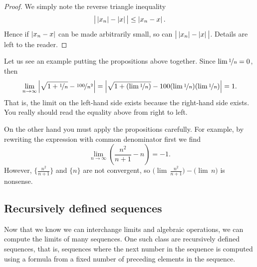 \begin{proof}
We simply note the reverse triangle inequality
\begin{equation*}
\big\lvert \left\lvert {x_n} \right\rvert - \left\lvert {x} \right\rvert \big\rvert \leq \left\lvert {x_n-x} \right\rvert .
\end{equation*}
Hence if $\left\lvert {x_n -x} \right\rvert$ can be made arbitrarily small, so can
$\big\lvert \left\lvert {x_n} \right\rvert - \left\lvert {x} \right\rvert \big\rvert$.
Details are left to the reader.
\end{proof}

Let us see an example putting the propositions above together.  Since
$\lim \nicefrac{1}{n} = 0$, then
\begin{equation*}
\lim_{n\to \infty}
\left\lvert {\sqrt{1 + \nicefrac{1}{n}} - \nicefrac{100}{n^2}} \right\rvert =  
\left\lvert {\sqrt{1 + (\lim \nicefrac{1}{n})} - 100 (\lim \nicefrac{1}{n})(\lim
\nicefrac{1}{n})} \right\rvert = 1.
\end{equation*}
That is, the limit on the left-hand side exists because the right-hand
side exists.  You really should read the equality above from right to left.

On the other hand you must apply the propositions carefully.
For example, by rewriting the expression with common denominator first
we find
\begin{equation*}
\lim_{n\to \infty} \left( \frac{n^2}{n+1} - n \right)
= -1 .
\end{equation*}
However, 
$\bigl\{ \frac{n^2}{n+1} \bigr\}$ and 
$\{n\}$ are not convergent,
so
$\bigl(\lim\, \frac{n^2}{n+1}\bigr) -
\bigl(\lim\, n\bigr)$ is nonsense.

\subsection{Recursively defined sequences}

Now that we know we can interchange limits and algebraic operations, we can
compute the limits of many sequences.
One such class are recursively defined sequences, that is, sequences where
the next number in the sequence is computed using a formula from a fixed number
of preceding elements in the sequence.

